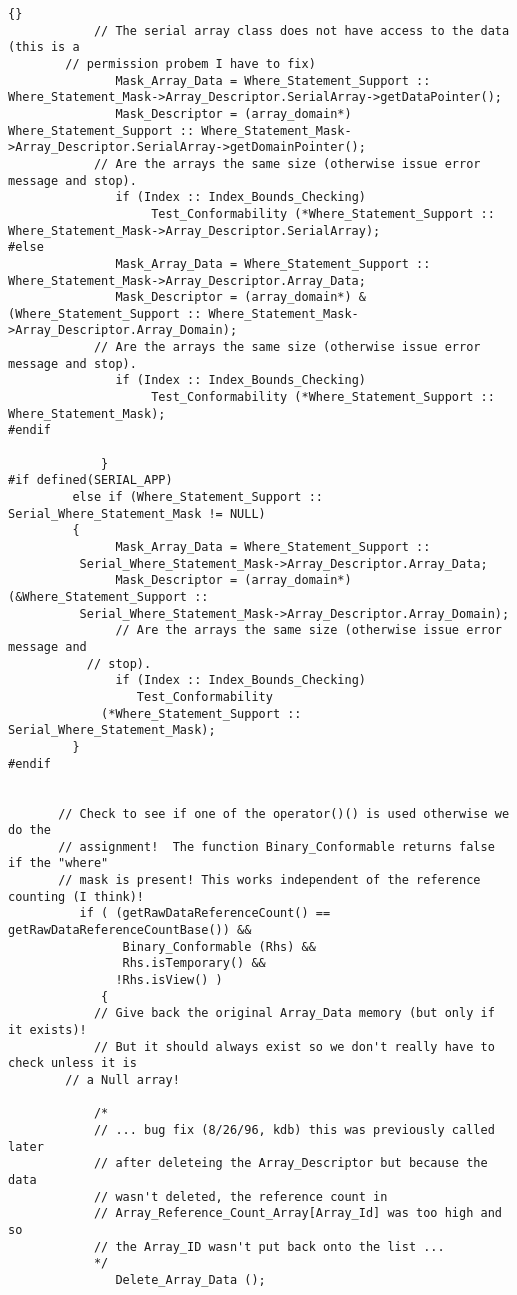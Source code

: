 \documentclass[10pt]{llncs}
\begin{document}
\begin{lstlisting}{}
            // The serial array class does not have access to the data (this is a 
	    // permission probem I have to fix) 
               Mask_Array_Data = Where_Statement_Support :: Where_Statement_Mask->Array_Descriptor.SerialArray->getDataPointer();
               Mask_Descriptor = (array_domain*) Where_Statement_Support :: Where_Statement_Mask->Array_Descriptor.SerialArray->getDomainPointer();
            // Are the arrays the same size (otherwise issue error message and stop).
               if (Index :: Index_Bounds_Checking)
                    Test_Conformability (*Where_Statement_Support :: Where_Statement_Mask->Array_Descriptor.SerialArray);
#else
               Mask_Array_Data = Where_Statement_Support :: Where_Statement_Mask->Array_Descriptor.Array_Data;
               Mask_Descriptor = (array_domain*) &(Where_Statement_Support :: Where_Statement_Mask->Array_Descriptor.Array_Domain);
            // Are the arrays the same size (otherwise issue error message and stop).
               if (Index :: Index_Bounds_Checking)
                    Test_Conformability (*Where_Statement_Support :: Where_Statement_Mask);
#endif

             }
#if defined(SERIAL_APP)
	     else if (Where_Statement_Support :: Serial_Where_Statement_Mask != NULL)
	     {
               Mask_Array_Data = Where_Statement_Support :: 
		  Serial_Where_Statement_Mask->Array_Descriptor.Array_Data;
               Mask_Descriptor = (array_domain*)(&Where_Statement_Support :: 
		  Serial_Where_Statement_Mask->Array_Descriptor.Array_Domain);
               // Are the arrays the same size (otherwise issue error message and 
	       // stop).
               if (Index :: Index_Bounds_Checking)
                  Test_Conformability 
		     (*Where_Statement_Support :: Serial_Where_Statement_Mask);
	     }
#endif


       // Check to see if one of the operator()() is used otherwise we do the 
       // assignment!  The function Binary_Conformable returns false if the "where" 
       // mask is present! This works independent of the reference counting (I think)!
          if ( (getRawDataReferenceCount() == getRawDataReferenceCountBase()) &&
                Binary_Conformable (Rhs) && 
                Rhs.isTemporary() &&
               !Rhs.isView() )
             {
            // Give back the original Array_Data memory (but only if it exists)!
            // But it should always exist so we don't really have to check unless it is 
	    // a Null array!

            /*
            // ... bug fix (8/26/96, kdb) this was previously called later
            // after deleteing the Array_Descriptor but because the data
            // wasn't deleted, the reference count in
            // Array_Reference_Count_Array[Array_Id] was too high and so
            // the Array_ID wasn't put back onto the list ...
            */
               Delete_Array_Data ();


\end{lstlisting}
\end{document}
